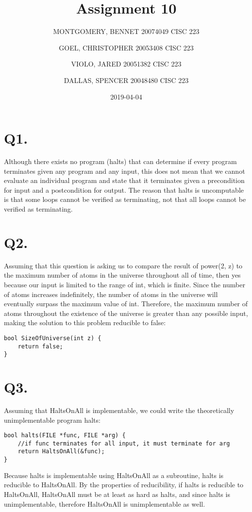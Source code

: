 \documentclass{article}
\title{Assignment 10}
\date{2019-04-04}
\author{MONTGOMERY, BENNET 20074049 CISC 223\\
		\and GOEL, CHRISTOPHER 20053408 CISC 223\\
		\and VIOLO, JARED 20051382 CISC 223\\
		\and DALLAS, SPENCER 20048480 CISC 223
		}
\begin{document}
	\maketitle
	
	\section*{Q1.}
	Although there exists no program ({\selectfont halts}) that can determine if every program terminates given any program and any input, this does not mean that we cannot evaluate an individual program and state that it terminates given a precondition for input and a postcondition for output. The reason that {\selectfont halts} is uncomputable is that some loops cannot be verified as terminating, not that all loops cannot be verified as terminating. 
	
	\section*{Q2.}
	Assuming that this question is asking us to compare the result of {\selectfont power(2, z)} to the maximum number of atoms in the universe throughout all of time, then yes because our input is limited to the range of {\selectfont int}, which is finite. Since the number of atoms increases indefinitely, the number of atoms in the universe will eventually surpass the maximum value of {\selectfont int}. Therefore, the maximum number of atoms throughout the existence of the universe is greater than any possible input, making the solution to this problem reducible to {\selectfont false}:
	\begin{lstlisting}
bool SizeOfUniverse(int z) {
	return false;
}
	\end{lstlisting}
	\section*{Q3.}
	Assuming that {\selectfont HaltsOnAll} is implementable, we could write the theoretically unimplementable program {\selectfont halts}:
	\begin{lstlisting}
bool halts(FILE *func, FILE *arg) {
	//if func terminates for all input, it must terminate for arg
	return HaltsOnAll(&func);
}
	\end{lstlisting}
	Because {\selectfont halts} is implementable using {\selectfont HaltsOnAll} as a subroutine, {\selectfont halts} is reducible to {\selectfont HaltsOnAll}. By the properties of reducibility, if {\selectfont halts} is reducible to {\selectfont HaltsOnAll}, {\selectfont HaltsOnAll} must be at least as hard as {\selectfont halts}, and since {\selectfont halts} is unimplementable, therefore {\selectfont HaltsOnAll} is unimplementable as well.
\end{document}
